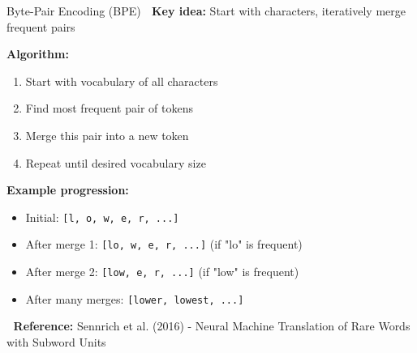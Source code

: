 \documentclass[aspectratio=169]{beamer}
\begin{document}
\begin{frame}[shrink=10]{Byte-Pair Encoding (BPE) 🔧}
    \textbf{Key idea:} Start with characters, iteratively merge frequent pairs

    \vspace{0.5em}
    \textbf{Algorithm:}
    \begin{enumerate}\setlength{\itemsep}{0pt}
        \item Start with vocabulary of all characters
        \item Find most frequent pair of tokens
        \item Merge this pair into a new token
        \item Repeat until desired vocabulary size
    \end{enumerate}

    \vspace{0.5em}
    \textbf{Example progression:}
    \begin{itemize}\setlength{\itemsep}{0pt}
        \item Initial: \texttt{[l, o, w, e, r, ...]}
        \item After merge 1: \texttt{[lo, w, e, r, ...]} (if "lo" is frequent)
        \item After merge 2: \texttt{[low, e, r, ...]} (if "low" is frequent)
        \item After many merges: \texttt{[lower, lowest, ...]}
    \end{itemize}

    \vspace{0.5em}
    📖 \textbf{Reference:} Sennrich et al. (2016) - Neural Machine Translation of Rare Words with Subword Units
\end{frame}
\end{document}
